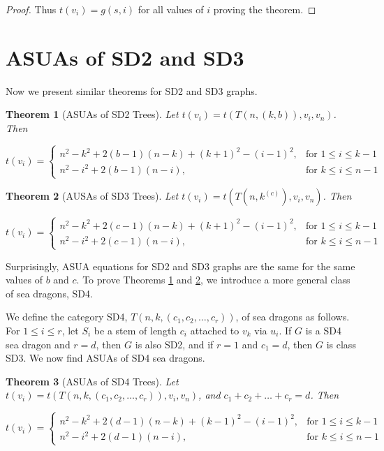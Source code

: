 \documentclass{article}
\newtheorem{theorem}{Theorem}[section]  %
\theoremstyle{definition}
\begin{document}
\begin{proof}
\noindent Thus $t(v_i) = g(s,i)$ for all values of $i$ proving the theorem.

\end{proof}

\section{ASUAs of SD2 and SD3}


\noindent Now we present similar theorems for SD2 and SD3 graphs.

\begin{theorem}[ASUAs of SD2 Trees]
\label{thm_sd2}
\noindent Let $t(v_i) = t(T(n,(k,b)),v_i,v_n)$. Then 

\[
t(v_i) = 
\begin{cases}
    n^2- k^2 + 2(b-1)(n-k) + (k+1)^2 - (i-1)^2, & \text{for } 1 \leq i \leq k-1 \\
    n^2- i^2 + 2(b-1)(n-i), & \text{for } k \leq i \leq n-1 
\end{cases}
\]
\end{theorem}

\begin{theorem}[AUSAs of SD3 Trees]
\label{thm_sd3}
\noindent Let $t(v_i) = t(T(n,k^{(c)}),v_i,v_n)$. Then 

\[
t(v_i) = 
\begin{cases}
    n^2- k^2 + 2(c-1)(n-k) + (k+1)^2 - (i-1)^2, & \text{for } 1 \leq i \leq k-1 \\
    n^2- i^2 + 2(c-1)(n-i), & \text{for } k \leq i \leq n-1 
\end{cases}
\]
\end{theorem}

\noindent Surprisingly, ASUA equations for SD2 and SD3 graphs are the same for the same values of $b$ and $c$. To prove Theorems \ref{thm_sd2} and \ref{thm_sd3}, we introduce a more general class of sea dragons, SD4.

\noindent We define the category SD4, $T(n,k,(c_1,c_2,\ldots,c_r))$, of sea dragons as follows. For $1\leq i \leq r$, let $S_i$ be a stem of length $c_i$ attached to $v_k$ via $u_i$. If $G$ is a SD4 sea dragon and $r=d$, then $G$ is also SD2, and if $r = 1$ and $c_1 = d$, then $G$ is class SD3. We now find ASUAs of SD4 sea dragons.

\begin{theorem}[ASUAs of SD4 Trees]
\label{thm:sd4}
\noindent Let $t(v_i) = t(T(n,k,(c_1, c_2, \ldots, c_r)),v_i,v_n)$, and $c_1 + c_2 + \ldots + c_r = d$. Then 

\[
t(v_i) = 
\begin{cases}
    n^2- k^2 + 2(d-1)(n-k) + (k-1)^2 - (i-1)^2, & \text{for } 1 \leq i \leq k-1 \\
    n^2- i^2 + 2(d-1)(n-i), & \text{for } k \leq i \leq n-1 
\end{cases}
\]
\end{theorem}
\end{document}
